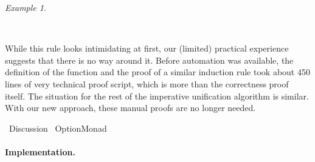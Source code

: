 \documentclass[copyright,creativecommons,sharealike]{eptcs}
\theoremstyle{remark}
\newtheorem{example}{Example}
\begin{document}
\begin{isabellebody}
\begin{isamarkuptext}
\begin{example}
\begin{center}
{}{\ \isa{{\isasymLongrightarrow}}\ }
\end{center}
  \smallskip
  While this rule looks intimidating at first, our (limited) practical
  experience suggests that there is no way around it.
  Before automation was available, the definition of the function and
  the proof of a similar induction rule took about 450 lines of very
  technical proof script, which is more than the correctness
  proof itself.
  The situation for the rest of the imperative unification algorithm is
  similar.
  With our new approach, these manual proofs are no longer needed.
\end{example}
\vspace*{-4pt}\end{isamarkuptext}\isamarkuptrue \isadelimtheory
\endisadelimtheory
\isatagtheory
{}\isamarkupfalse \endisatagtheory
{\isafoldtheory}\isadelimtheory
\endisadelimtheory
\end{isabellebody} \begin{isabellebody}\def\isabellecontext{Discussion}\isadelimtheory
\endisadelimtheory
\isatagtheory
{}\isamarkupfalse \ Discussion\isanewline
{}\ Option{\isacharunderscore}Monad\isanewline
{}\endisatagtheory
{\isafoldtheory}\isadelimtheory
\endisadelimtheory
{}
\isamarkuptrue \label{discussion}
\begin{isamarkuptext}\paragraph{Implementation.}


\end{isamarkuptext}
\end{isabellebody}
\end{document}
